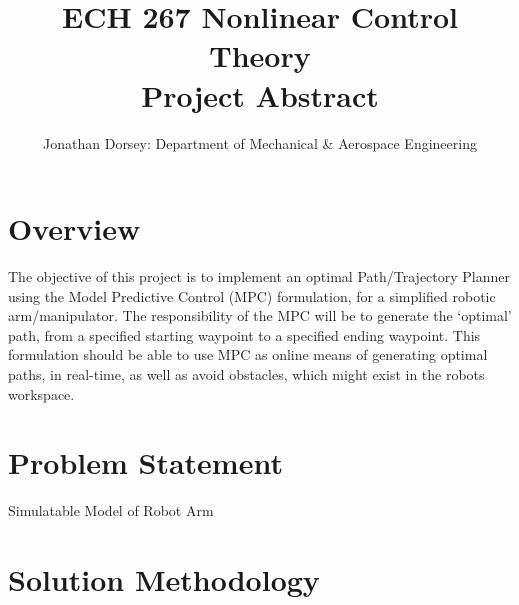 \documentclass[12px]{article}
\begin{document}
    \title{ECH 267 Nonlinear Control Theory \\ Project Abstract }

    \author{Jonathan Dorsey: Department of Mechanical \& Aerospace Engineering}

    \maketitle


    \section{Overview}

    The objective of this project is to implement an optimal Path/Trajectory Planner using the Model Predictive Control (MPC) formulation, for a simplified robotic arm/manipulator. The responsibility of the MPC will be to generate the `optimal' path, from a specified starting waypoint to a specified ending waypoint. This formulation should be able to use MPC as online means of generating optimal paths, in real-time, as well as avoid obstacles, which might exist in the robots workspace.

    \section{Problem Statement}

    \begin{list}
        \item Simulatable Model of Robot Arm
        \item
    \end{list}


    \section{Solution Methodology}
\end{document}
